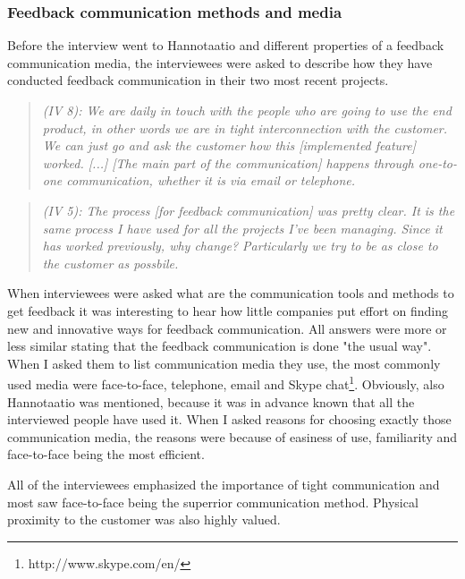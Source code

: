 \documentclass[english,12pt,a4paper,pdftex]{article}
\newcommand{\q}[2]{
\begin{quote}
\emph{(IV #1): #2}
\end{quote}}
\begin{document}
\subsubsection{Feedback communication methods and media}

Before the interview went to Hannotaatio and different properties of a feedback communication media, the interviewees were asked to describe how they have conducted feedback communication in their two most recent projects.

\q{8}{We are daily in touch with the people who are going to use the end product, in other words we are in tight interconnection with the customer. We can just go and ask the customer how this [implemented feature] worked. [...] [The main part of the communication] happens through one-to-one communication, whether it is via email or telephone.}

\q{5}{The process [for feedback communication] was pretty clear. It is the same process I have used for all the projects I've been managing. Since it has worked previously, why change? Particularly we try to be as close to the customer as possbile.}

When interviewees were asked what are the communication tools and methods to get feedback it was interesting to hear how little companies put effort on finding new and innovative ways for feedback communication. All answers were more or less similar stating that the feedback communication is done "the usual way". When I asked them to list communication media they use, the most commonly used media were face-to-face, telephone, email and Skype chat\footnote{http://www.skype.com/en/}. Obviously, also Hannotaatio was mentioned, because it was in advance known that all the interviewed people have used it. When I asked reasons for choosing exactly those communication media, the reasons were because of easiness of use, familiarity and face-to-face being the most efficient. 

All of the interviewees emphasized the importance of tight communication and most saw face-to-face being the superrior communication method. Physical proximity to the customer was also highly valued.
\end{document}
